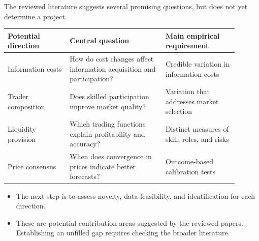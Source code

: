 \begin{frame}[t]
\par{}
\begin{pmbody}
{\color{pmGrey}\fontsize{20}{27}\selectfont The reviewed literature suggests several promising questions, but does not yet determine a project.\par}
\vspace{4pt}
{\centering
\fontsize{18}{23}\selectfont\begin{tabular}{>{\raggedright\arraybackslash}p{0.24\linewidth}>{\raggedright\arraybackslash}p{0.37\linewidth}>{\raggedright\arraybackslash}p{0.29\linewidth}}
\toprule
\rowcolor{pmPanel}\textcolor{pmNavy}{\textbf{Potential direction}} & \textcolor{pmNavy}{\textbf{Central question}} & \textcolor{pmNavy}{\textbf{Main empirical requirement}} \\
\midrule
Information costs & How do cost changes affect information acquisition and participation? & Credible variation in information costs \\
Trader composition & Does skilled participation improve market quality? & Variation that addresses market selection \\
Liquidity provision & Which trading functions explain profitability and accuracy? & Distinct measures of skill, roles, and risks \\
Price consensus & When does convergence in prices indicate better forecasts? & Outcome-based calibration tests \\
\bottomrule
\end{tabular}\par}
\vspace{4pt}
\begin{itemize}\pmspreaditems
  \item The next step is to assess novelty, data feasibility, and identification for each direction.
  \item These are potential contribution areas suggested by the reviewed papers. Establishing an unfilled gap requires checking the broader literature.
\end{itemize}
\end{pmbody}
\end{frame}

